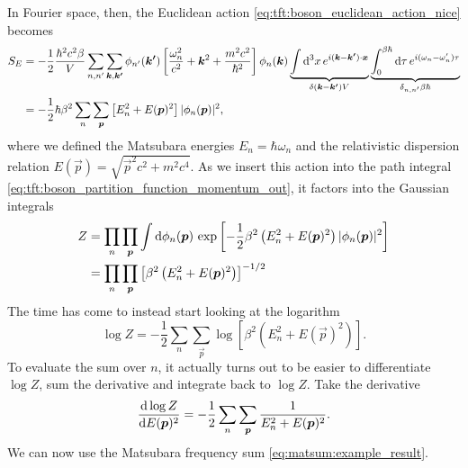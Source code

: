 In Fourier space, then, the Euclidean action \eqref{eq:tft:boson_euclidean_action_nice} becomes
\begin{equation}
\begin{split}
	S_E & = -\frac12 \frac{\hbar^2 c^2 \beta}{V}
	        \sum_{n,n'} \sum_{{\bm{k}},{\bm{k'}}} 
	    	  \phi_{n'}({\bm{k'}}) 
	    	  \left[ \frac{\omega_n^2}{c^2} + {\bm{k}}^2 + \frac{m^2 c^2}{\hbar^2} \right] 
	  	  \phi_{n}({\bm{k}})
	  	  \underbrace{\int \mathop{}\!\mathrm{d}^3 x \, e^{i ({\bm{k}} - {\bm{k'}}) \cdot {\bm{x}}}}_{\delta({\bm{k}}-{\bm{k'}}) V}
	      \underbrace{\int_0^{\beta \hbar} \mathop{}\!\mathrm{d} \tau \, e^{i (\omega_n - \omega_n') \tau}}_{\delta_{n,n'} \beta \hbar}
	  	  \\
	    & = -\frac12 \hbar \beta^2
	        \sum_n \sum_{\bm{p}}
	  	    \left[ E_n^2 + E({\bm{p}})^2 \right] 
		    \lvert \phi_{n}({\bm{p}}) \rvert^2 ,
\end{split}
\end{equation}
where we defined the Matsubara energies $E_n = \hbar \omega_n$ and the relativistic dispersion relation $E(\vec{p}) = \sqrt{\vec{p}^2 c^2 + m^2 c^4}$.
As we insert this action into the path integral \eqref{eq:tft:boson_partition_function_momentum_out}, it factors into the Gaussian integrals
\begin{equation}
\begin{split}
	Z & =
	\prod_{n} \prod_{{\bm{p}}}
	\int \mathop{}\!\mathrm{d} \phi_n({\bm{p}}) \,
	\exp \left[
		-\frac12 \beta^2 \left(
			E_n^2 + E({\bm{p}})^2
		\right)
		\lvert \phi_n({\bm{p}}) \rvert^2
	\right] \\
	  & =
	\prod_{n} \prod_{{\bm{p}}} \left[ 
		\beta^2 \left( 
			E_n^2 + E({\bm{p}})^2
		\right)
	\right]^{-1/2}
\end{split}
\label{eq:tft:boson_gaussian_integral}
\end{equation}
The time has come to instead start looking at the logarithm
\begin{equation}
	\log Z = -\frac12 \sum_n \sum_\vec{p} 
	         \log \left[ \beta^2 \left( E_n^2 + E(\vec{p})^2 \right) \right] .
\end{equation}
To evaluate the sum over $n$, it actually turns out to be easier to differentiate $\log Z$, sum the derivative and integrate back to $\log Z$.
Take the derivative
\begin{equation}
	\odv{\log Z}{E(\vec{p})^2} = -\frac12 \sum_n \sum_\vec{p} \frac{1}{E_n^2 + E(\vec{p})^2} .
\label{eq:tft:matsubara_sum_bosons}
\end{equation}
We can now use the Matsubara frequency sum \eqref{eq:matsum:example_result}.
